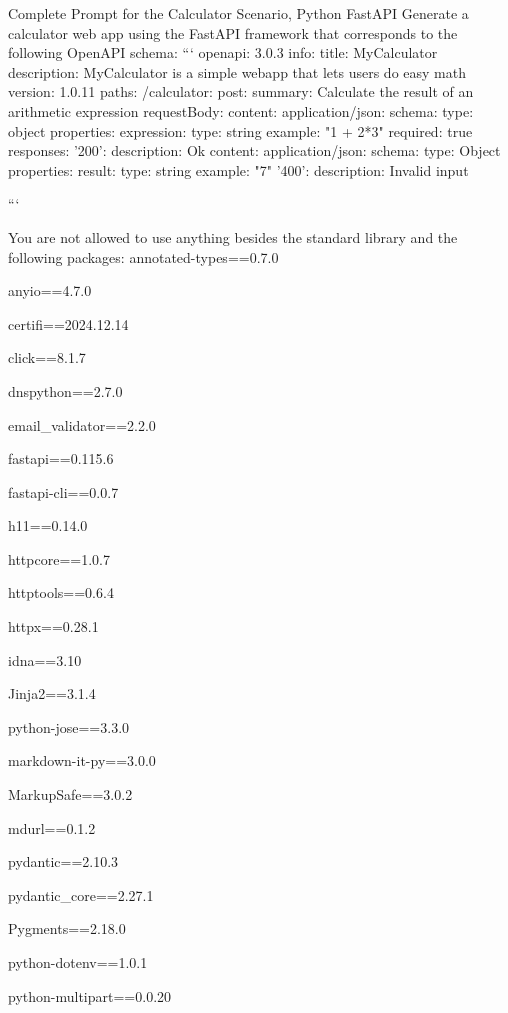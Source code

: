 \begin{prompt}{{Complete Prompt for the Calculator Scenario, Python FastAPI}}
Generate a calculator web app using the FastAPI framework that corresponds to the following OpenAPI schema:
```
openapi: 3.0.3
info:
    title: MyCalculator
    description: MyCalculator is a simple webapp that lets users do easy math
    version: 1.0.11
paths:
    /calculator:
    post:
        summary: Calculate the result of an arithmetic expression
        requestBody:
        content:
            application/json:
            schema:
                type: object
                properties:
                expression:
                    type: string
                    example: "1 + 2*3"
        required: true
        responses:
        '200':
            description: Ok
            content:
            application/json:
                schema:
                type: Object
                    properties:
                    result:
                        type: string
                        example: "7"
        '400':
            description: Invalid input

```

You are not allowed to use anything besides the standard library and the following packages:
annotated-types==0.7.0

anyio==4.7.0

certifi==2024.12.14

click==8.1.7

dnspython==2.7.0

email_validator==2.2.0

fastapi==0.115.6

fastapi-cli==0.0.7

h11==0.14.0

httpcore==1.0.7

httptools==0.6.4

httpx==0.28.1

idna==3.10

Jinja2==3.1.4

python-jose==3.3.0

markdown-it-py==3.0.0

MarkupSafe==3.0.2

mdurl==0.1.2

pydantic==2.10.3

pydantic_core==2.27.1

Pygments==2.18.0

python-dotenv==1.0.1

python-multipart==0.0.20


\end{prompt}
